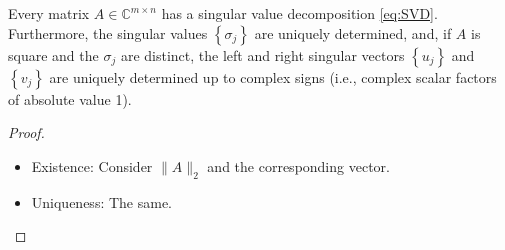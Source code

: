 \begin{theorem}
\label{thm: Existence and uniqueness of SVD}
Every matrix $A \in \mathbb{C}^{m \times n}$ has a singular value decomposition \eqref{eq:SVD}. Furthermore, the singular values $\left\{\sigma_j\right\}$ are uniquely determined, and, if $A$ is square and the $\sigma_j$ are distinct, the left and right singular vectors $\left\{u_j\right\}$ and $\left\{v_j\right\}$ are uniquely determined up to complex signs (i.e., complex scalar factors of absolute value 1).
\end{theorem}
\begin{proof}
\begin{itemize}
    \item Existence: Consider $\|A\|_2$ and the corresponding vector. 
    \item Uniqueness: The same. 
\end{itemize}
\end{proof}
